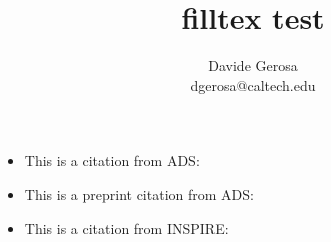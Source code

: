 \documentclass[]{article}
\begin{document}
\title{filltex test}

\author{Davide Gerosa\\dgerosa@caltech.edu}

\maketitle


\begin{itemize}
\item This is a citation from ADS: \cite{2016PhRvL.116f1102A}
\item This is a preprint citation from ADS: \cite{2016arXiv160203837T}
\item This is a citation from INSPIRE: \cite{Abbott:2016blz}
\end{itemize}



\end{document}
